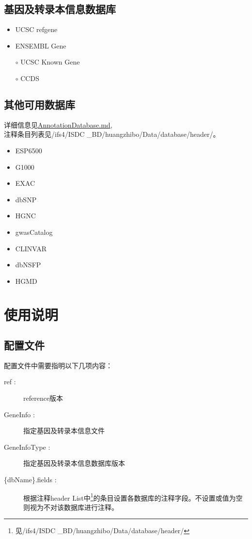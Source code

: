 \documentclass[UTF8,10pt,a4paper]{ctexart}
\begin{document}
\subsection{基因及转录本信息数据库}
\begin{itemize}
	\item UCSC refgene
        \item ENSEMBL Gene
        \item[$\circ$] UCSC Known Gene
         \item[$\circ$] CCDS
\end{itemize}

\subsection{其他可用数据库}
详细信息见\href{https://github.com/huangzhibo/Documents/blob/master/GaeaAnnotator/AnnotationDatabase.md}{AnnotationDatabase.md}, \\
\indent 注释条目列表见/ifs4/ISDC \_BD/huangzhibo/Data/database/header/。

\begin{itemize}
\item ESP6500
\item G1000
\item EXAC
\item dbSNP
\item HGNC
\item gwasCatalog
\item CLINVAR
\item dbNSFP
\item HGMD
\end{itemize}


\section{使用说明}
\subsection{配置文件}
配置文件中需要指明以下几项内容：
\begin{description}
\item[ ref : ]  reference版本
\item[ GeneInfo : ] 指定基因及转录本信息文件
\item[ GeneInfoType : ] 指定基因及转录本信息数据库版本
\item[ \{dbName\}.fields : ]  根据注释header List中\footnote{见/ifs4/ISDC \_BD/huangzhibo/Data/database/header/}的条目设置各数据库的注释字段。不设置或值为空则视为不对该数据库进行注释。
\end{description}
\end{document}

